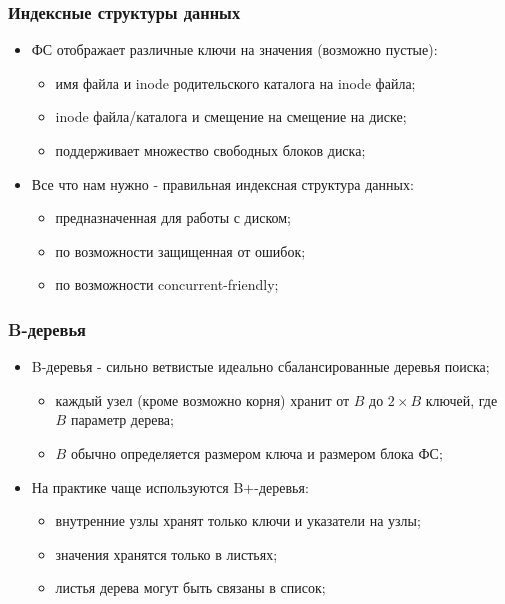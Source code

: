 \begin{frame}
\frametitle{Индексные структуры данных}
\begin{itemize}
  \item<1-> ФС отображает различные ключи на значения (возможно пустые):
    \begin{itemize}
      \item имя файла и inode родительского каталога на inode файла;
      \item inode файла/каталога и смещение на смещение на диске;
      \item поддерживает множество свободных блоков диска;
    \end{itemize}
  \item<2-> Все что нам нужно - правильная индексная структура данных:
    \begin{itemize}
      \item предназначенная для работы с диском;
      \item по возможности защищенная от ошибок;
      \item по возможности concurrent-friendly;
    \end{itemize}
\end{itemize}
\end{frame}

\begin{frame}
\frametitle{B-деревья}
\begin{itemize}
  \item<1-> B-деревья - сильно ветвистые идеально сбалансированные деревья поиска;
    \begin{itemize}
      \item каждый узел (кроме возможно корня) хранит от $B$ до $2 \times B$ ключей, где $B$ параметр дерева;
      \item $B$ обычно определяется размером ключа и размером блока ФС;
    \end{itemize}
  \item<2-> На практике чаще используются B+-деревья:
    \begin{itemize}
      \item внутренние узлы хранят только ключи и указатели на узлы;
      \item значения хранятся только в листьях;
      \item листья дерева могут быть связаны в список;
    \end{itemize}
\end{itemize}
\end{frame}

